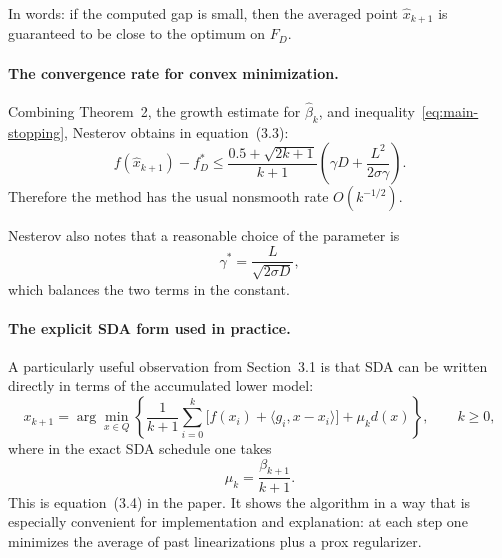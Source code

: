 \documentclass[12pt,a4paper]{article}
\begin{document}
In words: if the computed gap is small, then the averaged point $\hat{x}_{k+1}$ is guaranteed to be close to the optimum on $F_D$.

\paragraph{The convergence rate for convex minimization.}
Combining Theorem~2, the growth estimate for $\hat{\beta}_k$, and inequality~\eqref{eq:main-stopping}, Nesterov obtains in equation~(3.3):
\begin{equation}
    f(\hat{x}_{k+1}) - f_D^*
    \le
    \frac{0.5 + \sqrt{2k+1}}{k+1}
    \left(
        \gamma D + \frac{L^2}{2\sigma\gamma}
    \right).
    \label{eq:rate-minimization}
\end{equation}
Therefore the method has the usual nonsmooth rate $O(k^{-1/2})$.

Nesterov also notes that a reasonable choice of the parameter is
\begin{equation}
    \gamma^* = \frac{L}{\sqrt{2\sigma D}},
\end{equation}
which balances the two terms in the constant.

\paragraph{The explicit SDA form used in practice.}
A particularly useful observation from Section~3.1 is that SDA can be written directly in terms of the accumulated lower model:
\begin{equation}
    x_{k+1}
    =
    \arg\min_{x \in Q}
    \left\{
        \frac{1}{k+1}
        \sum_{i=0}^k
        \bigl[f(x_i)+\langle g_i, x-x_i \rangle\bigr]
        + \mu_k d(x)
    \right\},
    \qquad k \ge 0,
    \label{eq:sda-lower-model}
\end{equation}
where in the exact SDA schedule one takes
\begin{equation}
    \mu_k = \frac{\beta_{k+1}}{k+1}.
\end{equation}
This is equation~(3.4) in the paper. It shows the algorithm in a way that is especially convenient for implementation and explanation: at each step one minimizes the average of past linearizations plus a prox regularizer.
\end{document}
